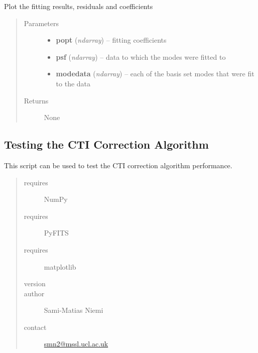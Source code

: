 \documentclass[a4paper,12pt,english]{sphinxmanual}
\begin{document}
\begin{fulllineitems}
\label{analysis:analysis.fitPSF.visualise}
Plot the fitting results, residuals and coefficients
\begin{quote}\begin{description}
\item[{Parameters}] \leavevmode\begin{itemize}
\item {} 
\textbf{popt} (\emph{ndarray}) -- fitting coefficients

\item {} 
\textbf{psf} (\emph{ndarray}) -- data to which the modes were fitted to

\item {} 
\textbf{modedata} (\emph{ndarray}) -- each of the basis set modes that were fit to the data

\end{itemize}

\item[{Returns}] \leavevmode
None

\end{description}\end{quote}

\end{fulllineitems}

\label{analysis:module-analysis.testCTIcorrection}

\subsection{Testing the CTI Correction Algorithm}
\label{analysis:testing-the-cti-correction-algorithm}
This script can be used to test the CTI correction algorithm performance.
\begin{quote}\begin{description}
\item[{requires}] \leavevmode
NumPy

\item[{requires}] \leavevmode
PyFITS

\item[{requires}] \leavevmode
matplotlib

\item[{version}] 

\item[{author}] \leavevmode
Sami-Matias Niemi

\item[{contact}] \leavevmode
\href{mailto:smn2@mssl.ucl.ac.uk}{smn2@mssl.ucl.ac.uk}

\end{description}\end{quote}
\end{document}
